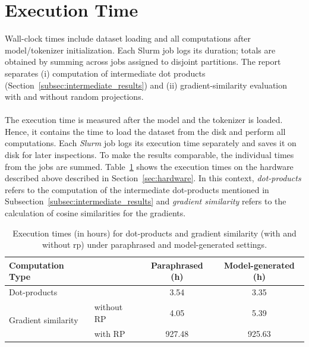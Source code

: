 \section{Execution Time}\label{sec:exec_time}
Wall-clock times include dataset loading and all computations after model/tokenizer initialization. Each Slurm job logs its duration; totals are obtained by summing across jobs assigned to disjoint partitions. The report separates (i) computation of intermediate dot products (Section~\ref{subsec:intermediate_results}) and (ii) gradient-similarity evaluation with and without random projections.
\\\\
The execution time is measured after the model and the tokenizer is loaded. Hence, it contains the time to load the dataset from the disk and perform all computations. Each \emph{Slurm} job logs its execution time separately and saves it on disk for later inspections. To make the results comparable, the individual times from the jobs are summed. Table~\ref{tab:execution_times} shows the execution times on the hardware described above described in Section~\ref{sec:hardware}. In this context, \emph{dot-products} refers to the computation of the intermediate dot-products mentioned in Subsection~\ref{subsec:intermediate_results} and \emph{gradient similarity} refers to the calculation of cosine similarities for the gradients. 
\begin{table}[H]
    \centering
    \begin{tabular}{|l l|c|c|}
        \hline
        \textbf{Computation Type} & & \textbf{Paraphrased (h)} & \textbf{Model-generated (h)} \\
        \hline
        Dot-products & & 3.54 & 3.35 \\
        \hline
        \multirow{2}{*}{Gradient similarity} 
            & without RP & 4.05 & 5.39 \\
            & with RP & 927.48 & 925.63 \\
        \hline
    \end{tabular}
    \caption{Execution times (in hours) for dot-products and gradient similarity (with and without \acrfull{rp}) under paraphrased and model-generated settings.}
    \label{tab:execution_times}
\end{table}
